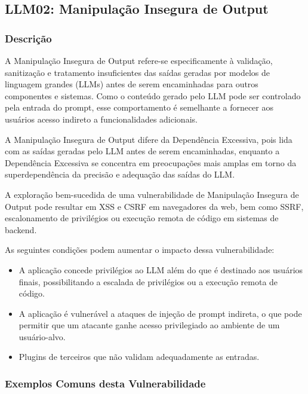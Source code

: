 \documentclass[
]{article}
\author{}
\date{}
\providecommand{\tightlist}{%
  \setlength{\itemsep}{0pt}\setlength{\parskip}{0pt}}
\begin{document}
\subsection{LLM02: Manipulação Insegura de
Output}\label{llm02-manipulauxe7uxe3o-insegura-de-output}

\subsubsection{Descrição}\label{descriuxe7uxe3o}

A Manipulação Insegura de Output refere-se especificamente à validação,
sanitização e tratamento insuficientes das saídas geradas por modelos de
linguagem grandes (LLMs) antes de serem encaminhadas para outros
componentes e sistemas. Como o conteúdo gerado pelo LLM pode ser
controlado pela entrada do prompt, esse comportamento é semelhante a
fornecer aos usuários acesso indireto a funcionalidades adicionais.

A Manipulação Insegura de Output difere da Dependência Excessiva, pois
lida com as saídas geradas pelo LLM antes de serem encaminhadas,
enquanto a Dependência Excessiva se concentra em preocupações mais
amplas em torno da superdependência da precisão e adequação das saídas
do LLM.

A exploração bem-sucedida de uma vulnerabilidade de Manipulação Insegura
de Output pode resultar em XSS e CSRF em navegadores da web, bem como
SSRF, escalonamento de privilégios ou execução remota de código em
sistemas de backend.

As seguintes condições podem aumentar o impacto dessa vulnerabilidade:

\begin{itemize}
\tightlist
\item
  A aplicação concede privilégios ao LLM além do que é destinado aos
  usuários finais, possibilitando a escalada de privilégios ou a
  execução remota de código.
\item
  A aplicação é vulnerável a ataques de injeção de prompt indireta, o
  que pode permitir que um atacante ganhe acesso privilegiado ao
  ambiente de um usuário-alvo.
\item
  Plugins de terceiros que não validam adequadamente as entradas.
\end{itemize}

\subsubsection{Exemplos Comuns desta
Vulnerabilidade}\label{exemplos-comuns-desta-vulnerabilidade}
\end{document}
